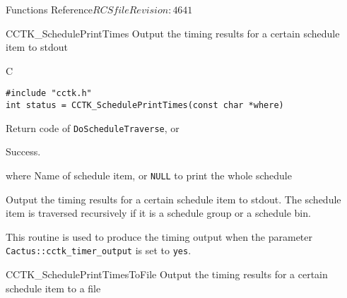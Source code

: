 \begin{cactuspart}{ Functions Reference}{$RCSfile$}{$Revision: 4641 $}



\begin{FunctionDescription}{CCTK\_SchedulePrintTimes}
  \label{CCTK-SchedulePrintTimes}
  Output the timing results for a certain schedule item to stdout
  
  \begin{SynopsisSection}
    \begin{Synopsis}{C}
\begin{verbatim}
#include "cctk.h"
int status = CCTK_SchedulePrintTimes(const char *where)
\end{verbatim}
    \end{Synopsis}
  \end{SynopsisSection}
  
  \begin{ResultSection}
    \begin{ResultNote}
      Return code of \texttt{DoScheduleTraverse}, or
    \end{ResultNote}
    \begin{Result}{0}
      Success.
    \end{Result}
  \end{ResultSection}
  
  \begin{ParameterSection}
    \begin{Parameter}{where}
      Name of schedule item, or \texttt{NULL} to print the whole
      schedule
    \end{Parameter}
  \end{ParameterSection}
  
  \begin{Discussion}
    Output the timing results for a certain schedule item to stdout.
    The schedule item is traversed recursively if it is a schedule
    group or a schedule bin.
    
    This routine is used to produce the timing output when the
    parameter \texttt{Cactus::cctk\_timer\_output} is set to
    \texttt{yes}.
  \end{Discussion}
  
  \begin{SeeAlsoSection}
    \begin{SeeAlso}{CCTK\_SchedulePrintTimesToFile}
      Output the timing results for a certain schedule item to a file
    \end{SeeAlso}
  \end{SeeAlsoSection}
  

\end{FunctionDescription}
\end{cactuspart}

